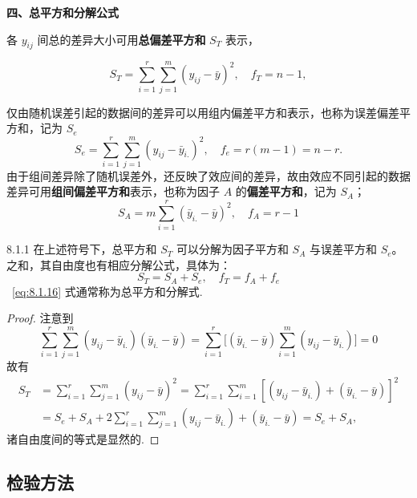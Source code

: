 \textbf{四、总平方和分解公式}

各 $y_{ij}$ 间总的差异大小可用\textbf{总偏差平方和} $S_T$ 表示，

\begin{equation}\label{eq:8.1.13}
  S_{T}=\sum_{i=1}^{r} \sum_{j=1}^{m}\left(y_{i j}-\bar{y}\right)^{2}, \quad f_{T} = n-1,
\end{equation}

仅由随机误差引起的数据间的差异可以用组内偏差平方和表示，也称为误差偏差平方和，记为 $S_e$
\begin{equation}\label{eq:8.1.14}
  S_{e}=\sum_{i=1}^{r} \sum_{j=1}^{m}\left(y_{i j}-\bar{y}_{i .}\right)^{2}, \quad f_{e}=r(m-1)=n-r.
\end{equation}
由于组间差异除了随机误差外，还反映了效应间的差异，故由效应不同引起的数据差异可用\textbf{组间偏差平方和}表示，也称为因子 $A$ 的\textbf{偏差平方和}，记为 $S_A$；
\begin{equation}\label{eq:8.1.15}
  S_{A}=m \sum_{i=1}^{r}\left(\bar{y}_{i.}-\bar{y}\right)^{2}, \quad f_{A}=r-1
\end{equation}

\begin{theorem}{}{8.1.1}
在上述符号下，总平方和 $S_T$ 可以分解为因子平方和 $S_A$ 与误差平方和 $S_e$。之和，其自由度也有相应分解公式，具体为：
\begin{equation} \label{eq:8.1.16}
S_{T}=S_{A}+ S_{e}, \quad f_{T}=f_{A}+f_{e}
\end{equation}
~\eqref{eq:8.1.16} 式通常称为总平方和分解式. 
\end{theorem}

\begin{proof}
注意到
  \begin{equation}
    \sum_{i=1}^{r} \sum_{j=1}^{m}(y_{i j}-\bar{y}_{i.})(\bar{y}_{i.}-\bar{y})= \sum_{i=1}^{r}\big[(\bar{y}_{i.}-\bar{y}) \sum_{i=1}^{m}(y_{i j}-\bar{y}_{i.})\big]=0
    \end{equation}
故有
    \begin{align*}
      S_{T} & =\sum_{i=1}^{r} \sum_{j=1}^{m}(y_{i j}-\bar{y})^{2} = \sum_{i=1}^{r} \sum_{i=1}^{m}[(y_{i j}-\bar{y}_{i.})+(\bar{y}_{i.}-\bar{y})]^{2}\\
      &=S_{e}+S_{A} + 2 \sum_{i=1}^{r} \sum_{j=1}^{m}(y_{i j}-\bar{y}_{i.})+(\bar{y}_{i .}-\bar{y}) = S_{e} + S_{A},
    \end{align*}
诸自由度间的等式是显然的.
\end{proof}

\subsection{检验方法}

